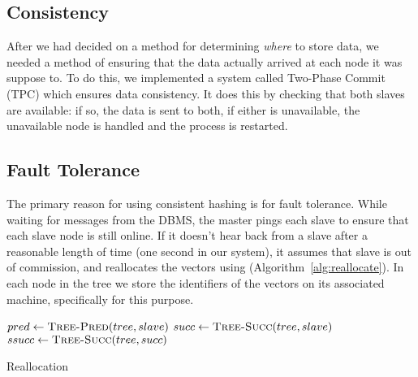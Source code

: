 \subsection{Consistency}
After we had decided on a method for determining \emph{where} to store data,
we needed a method of ensuring that the data actually arrived at each node it
was suppose to. To do this, we implemented a system called Two-Phase Commit
(TPC) which ensures data consistency. It does this by checking that both slaves
are available: if so, the data is sent to both, if either is unavailable, the
unavailable node is handled and the process is restarted.
%
\subsection{Fault Tolerance}
The primary reason for using consistent hashing is for fault tolerance. While
waiting for messages from the DBMS, the master pings each slave to ensure that
each slave node is still online. If it doesn't hear back from a slave after a
reasonable length of time (one second in our system), it assumes that slave is
out of commission, and reallocates the vectors using 
(Algorithm~\ref{alg:reallocate}). In each node in the tree we store the identifiers of
the vectors on its associated machine, specifically for this purpose.
%
\begin{algorithm}
    \begin{algorithmic}
            \State $pred \gets \Call{Tree-Pred}{tree, slave}$
            \State $succ \gets \Call{Tree-Succ}{tree, slave}$
            \State $ssucc \gets \Call{Tree-Succ}{tree, succ}$
                \State {}
            \EndFor
                \State {}
            \EndFor
            \State {}
        \EndProcedure
    \end{algorithmic}
    \caption{Reallocation}
    \label{alg:reallocate}
\end{algorithm}
%

